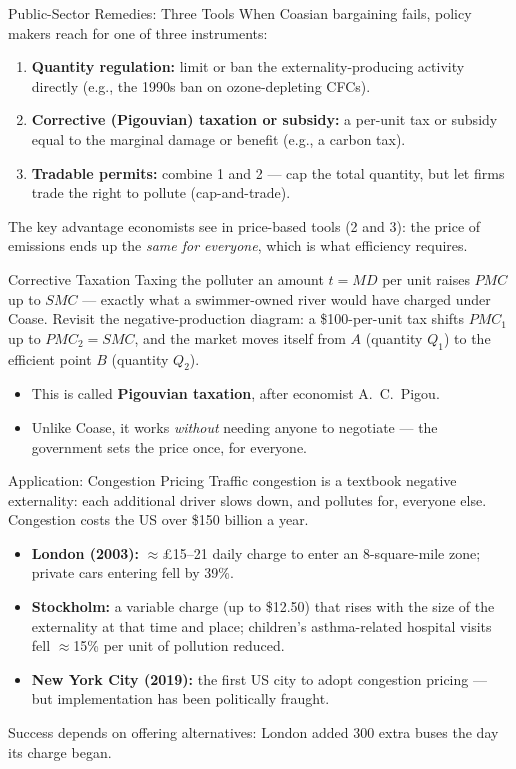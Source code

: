\documentclass[11pt,aspectratio=169]{beamer}
\begin{document}
\begin{frame}{Public-Sector Remedies: Three Tools}
  When Coasian bargaining fails, policy makers reach for one of three instruments:
  \begin{enumerate}
    \item \textbf{Quantity regulation:} limit or ban the externality-producing activity directly (e.g., the 1990s ban on ozone-depleting CFCs).
    \item \textbf{Corrective (Pigouvian) taxation or subsidy:} a per-unit tax or subsidy equal to the marginal damage or benefit (e.g., a carbon tax).
    \item \textbf{Tradable permits:} combine 1 and 2 --- cap the total quantity, but let firms trade the right to pollute (cap-and-trade).
  \end{enumerate}
  \vspace{0.4em}
  \small The key advantage economists see in price-based tools (2 and 3): the price of emissions ends up the \emph{same for everyone}, which is what efficiency requires.
\end{frame}

\begin{frame}{Corrective Taxation}
  Taxing the polluter an amount \(t = MD\) per unit raises \(PMC\) up to \(SMC\) --- exactly what a swimmer-owned river would have charged under Coase. Revisit the negative-production diagram: a \$100-per-unit tax shifts $PMC_1$ up to $PMC_2 = SMC$, and the market moves itself from $A$ (quantity $Q_1$) to the efficient point $B$ (quantity $Q_2$).
  \begin{itemize}
    \item This is called \textbf{Pigouvian taxation}, after economist A.\ C.\ Pigou.
    \item Unlike Coase, it works \emph{without} needing anyone to negotiate --- the government sets the price once, for everyone.
  \end{itemize}
\end{frame}

\begin{frame}{Application: Congestion Pricing}
  Traffic congestion is a textbook negative externality: each additional driver slows down, and pollutes for, everyone else. Congestion costs the US over \$150 billion a year.
  \begin{itemize}
    \item \textbf{London (2003):} $\approx$\pounds15--21 daily charge to enter an 8-square-mile zone; private cars entering fell by 39\%.
    \item \textbf{Stockholm:} a variable charge (up to \$12.50) that rises with the size of the externality at that time and place; children's asthma-related hospital visits fell $\approx$15\% per unit of pollution reduced.
    \item \textbf{New York City (2019):} the first US city to adopt congestion pricing --- but implementation has been politically fraught.
  \end{itemize}
  \small Success depends on offering alternatives: London added 300 extra buses the day its charge began.
\end{frame}
\end{document}
